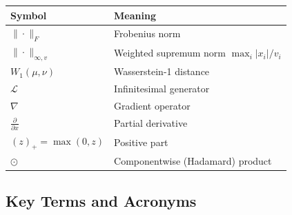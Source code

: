 \documentclass[12pt]{article}
\begin{document}
\begin{tabular}{ll}
\toprule
\textbf{Symbol} & \textbf{Meaning} \\
\midrule
$\|\cdot\|_F$ & Frobenius norm \\
$\|\cdot\|_{\infty, v}$ & Weighted supremum norm $\max_i |x_i| / v_i$ \\
$W_1(\mu, \nu)$ & Wasserstein-1 distance \\
$\mathcal{L}$ & Infinitesimal generator \\
$\nabla$ & Gradient operator \\
$\frac{\partial}{\partial x}$ & Partial derivative \\
$(z)_+ = \max(0, z)$ & Positive part \\
$\odot$ & Componentwise (Hadamard) product \\
\bottomrule
\end{tabular}

\subsection{Key Terms and Acronyms}
\end{document}
